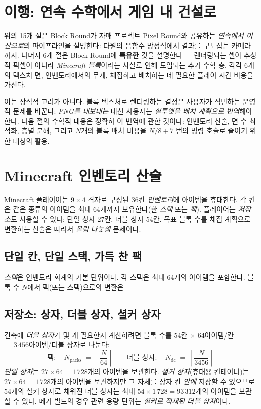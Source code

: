 \documentclass[12pt,a4paper]{scrartcl}
\newcommand{\acc}[1]{\textcolor{accent}{\textbf{#1}}}
\begin{document}
\section{이행: 연속 수학에서 게임 내 건설로}

위의 15개 절은 Block Round가 자매 프로젝트 Pixel Round와 공유하는 \emph{연속에서 이산으로}의 파이프라인을 설명한다: 타원의 음함수 방정식에서 결과를 구도잡는 카메라까지. 나머지 6개 절은 Block Round에 \acc{특유한} 것을 설명한다 — 렌더링되는 셀이 추상적 픽셀이 아니라 \emph{Minecraft 블록}이라는 사실로 인해 도입되는 추가 수학 층, 각각 6개의 텍스처 면, 인벤토리에서의 무게, 채집하고 배치하는 데 필요한 플레이 시간 비용을 가진다.

이는 장식적 고려가 아니다. 블록 텍스처로 렌더링하는 결정은 사용자가 직면하는 운영적 문제를 바꾼다: \emph{PNG를 내보내는} 대신 사용자는 \emph{실루엣을 배치 계획으로 번역}해야 한다. 다음 절의 수학적 내용은 정확히 이 번역에 관한 것이다: 인벤토리 산술, 면 수 최적화, 층별 분해, 그리고 $N$개의 블록 배치 비용을 $N/8 + 7$ 번의 명령 호출로 줄이기 위한 대칭의 활용.

\clearpage

\section{Minecraft 인벤토리 산술}

Minecraft 플레이어는 $9 \times 4$ 격자로 구성된 36칸 \emph{인벤토리}에 아이템을 휴대한다. 각 칸은 같은 종류의 아이템을 최대 $64$개까지 보유한다(한 \emph{스택} 또는 \emph{팩}). 플레이어는 \emph{저장소}도 사용할 수 있다: 단일 상자 $27$칸, 더블 상자 $54$칸. 목표 블록 수를 채집 계획으로 변환하는 산술은 따라서 \emph{올림 나눗셈} 문제이다.

\subsection{단일 칸, 단일 스택, 가득 찬 팩}
\emph{스택}은 인벤토리 회계의 기본 단위이다. 각 스택은 최대 $64$개의 아이템을 포함한다. 블록 수 $N$에서 팩(또는 스택)으로의 변환은

\subsection{저장소: 상자, 더블 상자, 셜커 상자}
건축에 \emph{더블 상자}가 몇 개 필요한지 계산하려면 블록 수를 $54$칸 $\times$ $64$아이템/칸 $= 3\,456$아이템/더블 상자로 나눈다:
\[
\text{팩}:\quad N_{\mathrm{packs}} \;=\; \left\lceil \dfrac{N}{64} \right\rceil
\qquad
\text{더블 상자}:\quad N_{\mathrm{dc}} \;=\; \left\lceil \dfrac{N}{3456} \right\rceil
\]
\emph{단일 상자}는 $27 \times 64 = 1\,728$개의 아이템을 보관한다. \emph{셜커 상자}(휴대용 컨테이너)는 $27 \times 64 = 1\,728$개의 아이템을 보관하지만 그 자체를 상자 칸 \emph{안에} 저장할 수 있으므로 $54$개의 셜커 상자로 채워진 더블 상자는 최대 $54 \times 1\,728 = 93\,312$개의 아이템을 보관할 수 있다. 메가 빌드의 경우 관련 용량 단위는 \emph{셜커로 적재된 더블 상자}이다.
\end{document}

